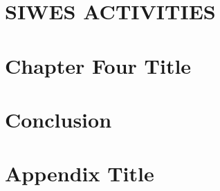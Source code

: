 \documentclass[12pt,twoside]{report}
\begin{document}
\chapter{SIWES ACTIVITIES}

 
\chapter{Chapter Four Title}

 
\chapter{Conclusion}


\appendix
\chapter{Appendix Title}

\end{document}
